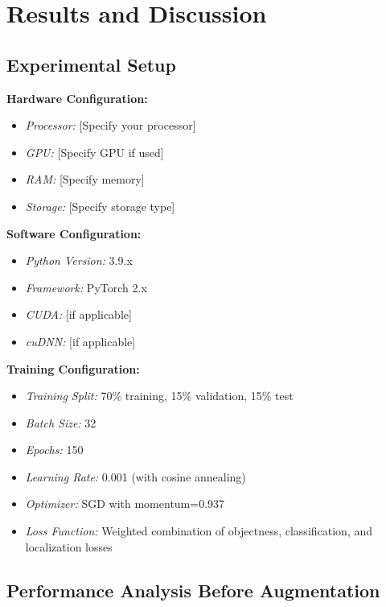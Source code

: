 \documentclass[11pt,a4paper]{article}
\begin{document}

\section{Results and Discussion}
\label{sec:results}

\subsection{Experimental Setup}

\textbf{Hardware Configuration:}
\begin{itemize}
    \item \textit{Processor:} [Specify your processor]
    \item \textit{GPU:} [Specify GPU if used]
    \item \textit{RAM:} [Specify memory]
    \item \textit{Storage:} [Specify storage type]
\end{itemize}

\textbf{Software Configuration:}
\begin{itemize}
    \item \textit{Python Version:} 3.9.x
    \item \textit{Framework:} PyTorch 2.x
    \item \textit{CUDA:} [if applicable]
    \item \textit{cuDNN:} [if applicable]
\end{itemize}

\textbf{Training Configuration:}
\begin{itemize}
    \item \textit{Training Split:} 70\% training, 15\% validation, 15\% test
    \item \textit{Batch Size:} 32
    \item \textit{Epochs:} 150
    \item \textit{Learning Rate:} 0.001 (with cosine annealing)
    \item \textit{Optimizer:} SGD with momentum=0.937
    \item \textit{Loss Function:} Weighted combination of objectness, classification, and localization losses
\end{itemize}

\subsection{Performance Analysis Before Augmentation}
\end{document}
